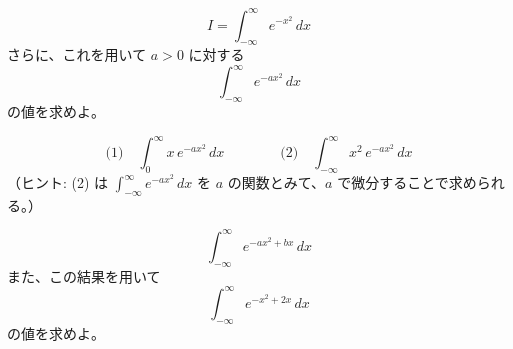 \documentclass[a4paper,11pt]{article}
\begin{document}


\[
I = \int_{-\infty}^{\infty} e^{-x^{2}}\, dx
\]
さらに、これを用いて $a > 0$ に対する
\[
\int_{-\infty}^{\infty} e^{-a x^{2}}\, dx
\]
の値を求めよ。

\[
\text{(1)}\quad \int_{0}^{\infty} x\, e^{-a x^{2}}\, dx
\qquad\qquad
\text{(2)}\quad \int_{-\infty}^{\infty} x^{2}\, e^{-a x^{2}}\, dx
\]
（ヒント: (2) は $\displaystyle\int_{-\infty}^{\infty} e^{-a x^{2}}\, dx$ を $a$ の関数とみて、$a$ で微分することで求められる。）

\[
\int_{-\infty}^{\infty} e^{-a x^{2} + b x}\, dx
\]
また、この結果を用いて
\[
\int_{-\infty}^{\infty} e^{-x^{2} + 2x}\, dx
\]
の値を求めよ。
\end{document}
